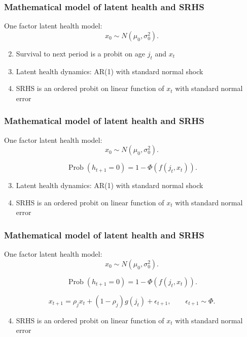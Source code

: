 \documentclass[aspectratio=169]{beamer}
\newcommand{\Prob}{\operatorname{Prob}}
\begin{document}
\begin{frame}\frametitle{Mathematical model of latent health and SRHS}
One factor latent health model:
\begin{equation}
x_0 \sim N(\mu_0, \sigma^2_0).
\end{equation}

\begin{enumerate}
	\setcounter{enumi}{1}
	\item Survival to next period is a probit on age $j_t$ and $x_t$
	
	\item Latent health dynamics: AR(1) with standard normal shock
	
	\item SRHS is an ordered probit on linear function of $x_t$ with standard normal error
\end{enumerate}
\end{frame}


\begin{frame}\frametitle{Mathematical model of latent health and SRHS}
One factor latent health model:
\setcounter{equation}{0}
\begin{equation}
x_0 \sim N(\mu_0, \sigma^2_0).
\end{equation}

\begin{equation}
\Prob(h_{t+1} = 0) = 1 - \Phi(f(j_t,x_t)).
\end{equation}

\begin{enumerate}
	\setcounter{enumi}{2}
	\item Latent health dynamics: AR(1) with standard normal shock
	
	\item SRHS is an ordered probit on linear function of $x_t$ with standard normal error
\end{enumerate}
\end{frame}


\begin{frame}\frametitle{Mathematical model of latent health and SRHS}
One factor latent health model:
\setcounter{equation}{0}
\begin{equation}
x_0 \sim N(\mu_0, \sigma^2_0).
\end{equation}

\begin{equation}
\Prob(h_{t+1} = 0) = 1 - \Phi(f(j_t,x_t)).
\end{equation}

\begin{equation}
x_{t+1} = \rho_{j} x_t + (1-\rho_j)g(j_t) + \epsilon_{t+1}, \qquad \epsilon_{t+1} \sim \Phi.
\end{equation}

\begin{enumerate}
	\setcounter{enumi}{3}
	\item SRHS is an ordered probit on linear function of $x_t$ with standard normal error
\end{enumerate}
\end{frame}
\end{document}
